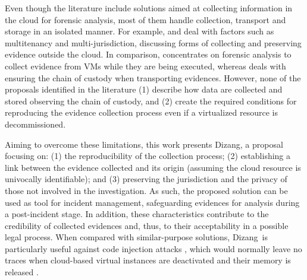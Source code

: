 \documentclass[10pt,journal,compsoc]{IEEEtran}
\newcommand{\marcos}[1]{{\color{green}{MARCOS: #1}}}
\newcommand{\fancyname}{Dizang}
\begin{document}
%
Even though the literature include solutions aimed at collecting information in the cloud for forensic analysis, most of them handle collection, transport and storage in an isolated manner.
%
For example, \cite{Dykstra_FROST:2013} and \cite{Reichert_Auto_acquisition:2015} deal with factors such as multitenancy and multi-jurisdiction, discussing forms of collecting and preserving evidence outside the cloud.
%
In comparison, \cite{George_DF2CE:2012} concentrates on forensic analysis to collect evidence from VMs while they are being executed, whereas \cite{Sang_Log_approach:2013} deals with ensuring the chain of custody when transporting evidences.
%
However, none of the proposals identified in the literature (1) describe how data are collected and stored observing the chain of custody, and (2) create the required conditions for reproducing the evidence collection process even if a virtualized resource is decommissioned.



%
Aiming to overcome these limitations, this work presents \fancyname, a proposal focusing on: (1) the reproducibility of the collection process; (2) establishing a link between the evidence collected and its origin (assuming the cloud resource is univocally identifiable); and (3) preserving the jurisdiction and the privacy of those not involved in the investigation.
%
As such, the proposed solution can be used as tool for incident management, safeguarding evidences for analysis during a post-incident stage.
%
In addition, these characteristics contribute to the credibility of collected evidences and, thus, to their acceptability in a possible legal process.
%
%
%
When compared with similar-purpose solutions, \fancyname\ is particularly useful against code injection attacks \cite{Case_Memory_Forensics:2014}, which would normally leave no traces when cloud-based virtual instances are deactivated and their memory is released \cite{Vomel_Memory_Acquisition:2013,Case_Memory_Forensics:2014}.
\end{document}
